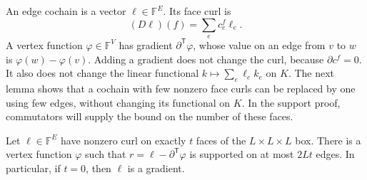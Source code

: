 An edge cochain is a vector $\ell\in\mathbb F^E$. Its face curl is
\[
 (D\ell)(f)=\sum_e c^f_e\ell_e.
\]
A vertex function $\varphi\in\mathbb F^V$ has gradient
$\partial^{\mathsf T}\varphi$, whose value on an edge from $v$ to $w$
is $\varphi(w)-\varphi(v)$. Adding a gradient does not change the curl,
because $\partial c^f=0$. It also does not change the linear functional
$k\mapsto\sum_e\ell_e k_e$ on $K$.
The next lemma shows that a cochain with few nonzero face curls can be
replaced by one using few edges, without changing its functional on $K$.
In the support proof, commutators
will supply the bound on the number of these faces.

\begin{lemma}\label{lem:sparse-cochain}
Let $\ell\in\mathbb F^E$ have nonzero curl on exactly $t$ faces of the
$L\times L\times L$ box. There is a vertex function $\varphi$ such that
$r=\ell-\partial^{\mathsf T}\varphi$ is supported on at most $2Lt$ edges.
In particular, if $t=0$, then $\ell$ is a gradient.
\end{lemma}
